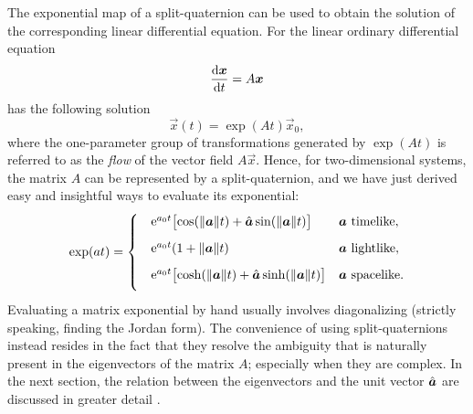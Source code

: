 The exponential map of a split-quaternion can be used to obtain the solution of the corresponding linear differential equation. For the linear ordinary differential equation
$$ \dv{\vec{x}}{t} = A\vec{x} $$
has the following solution \cite{Arnold1984}
$$ \vec{x}(t) = \exp(At)\vec{x}_0, $$
where the one-parameter group of transformations generated by $\exp(A t)$ is referred to as the \emph{flow} of the vector field $A\vec{x}$. Hence, for two-dimensional systems, the matrix $A$ can be represented by a split-quaternion, and we have just derived easy and insightful ways to evaluate its exponential: 
\begin{equation}
    \exp(a t) = 
    \begin{cases}
        \phantom \quad \ec^{a_0 t}\qty\big[\cos(\norm{\vec{a}} t) + \uvec{a}\sin(\norm{\vec{a}} t)] & $\vec{a}$ \text{ timelike}, \\[1.5ex]
        \phantom \quad \ec^{a_0 t}\qty(1 + \norm{\vec{a}}t ) & $\vec{a}$ \text{ lightlike}, \\[1.5ex]
        \phantom \quad \ec^{a_0 t}\qty\big[\cosh(\norm{\vec{a}} t) + \uvec{a}\sinh(\norm{\vec{a}} t)] & $\vec{a}$ \text{ spacelike}. \\[1.5ex]
    \end{cases}
    \label{eq:system_solution}
\end{equation}
Evaluating a matrix exponential by hand usually involves diagonalizing (strictly speaking, finding the Jordan form). The convenience of using split-quaternions instead resides in the fact that they resolve the ambiguity that is naturally present in the eigenvectors of the matrix $A$; especially when they are complex. In the next section, the relation between the eigenvectors and the unit vector $\uvec{a}$ are discussed in greater detail \cite{Moler2003}.
